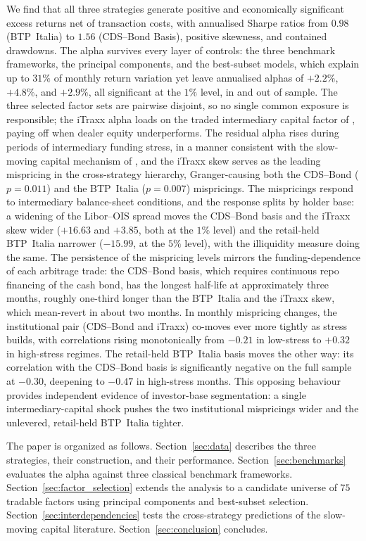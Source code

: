 We find that all three strategies generate positive and economically
significant excess returns net of transaction costs, with annualised
Sharpe ratios from $0.98$ (BTP~Italia) to $1.56$ (CDS--Bond Basis),
positive skewness, and contained drawdowns. The alpha survives every
layer of controls: the three benchmark frameworks, the principal
components, and the best-subset models, which explain up to $31\%$ of
monthly return variation yet leave annualised alphas of $+2.2\%$,
$+4.8\%$, and $+2.9\%$, all significant at the $1\%$ level, in and
out of sample. The three selected factor sets are pairwise disjoint,
so no single common exposure is responsible; the iTraxx alpha loads
on the traded intermediary capital factor of
\citet{he2017intermediary}, paying off when dealer equity
underperforms. The residual alpha rises during periods of
intermediary funding stress, in a manner consistent with the
slow-moving capital mechanism of \citet{duffie2010presidential}, and
the iTraxx skew serves as the leading mispricing in the
cross-strategy hierarchy, Granger-causing both the CDS--Bond
($p=0.011$) and the BTP~Italia ($p=0.007$) mispricings. The
mispricings respond to intermediary balance-sheet conditions, and the
response splits by holder base: a widening of the Libor--OIS spread
moves the CDS--Bond basis and the iTraxx skew wider ($+16.63$ and
$+3.85$, both at the $1\%$ level) and the retail-held BTP~Italia
narrower ($-15.99$, at the $5\%$ level), with the
\citet{amihud2015pricing} illiquidity measure doing the same. The
persistence of the mispricing levels mirrors the funding-dependence of
each arbitrage trade: the CDS--Bond basis, which requires continuous
repo financing of the cash bond, has the longest half-life at
approximately three months, roughly one-third longer than the
BTP~Italia and the iTraxx skew, which mean-revert in about two months. In monthly mispricing
changes, the institutional pair (CDS--Bond and iTraxx) co-moves ever
more tightly as stress builds, with correlations rising monotonically
from $-0.21$ in low-stress to $+0.32$ in high-stress regimes. The
retail-held BTP~Italia basis moves the other way: its correlation
with the CDS--Bond basis is significantly negative on the full sample
at $-0.30$, deepening to $-0.47$ in high-stress months. This opposing
behaviour provides independent evidence of investor-base
segmentation: a single intermediary-capital shock pushes the two
institutional mispricings wider and the unlevered, retail-held
BTP~Italia tighter.

The paper is organized as follows.
Section~\ref{sec:data} describes the three strategies, their
construction, and their performance.
Section~\ref{sec:benchmarks} evaluates the alpha against three
classical benchmark frameworks. Section~\ref{sec:factor_selection}
extends the analysis to a candidate universe of $75$ tradable factors
using principal components and best-subset selection.
Section~\ref{sec:interdependencies} tests the cross-strategy
predictions of the slow-moving capital literature.
Section~\ref{sec:conclusion} concludes.